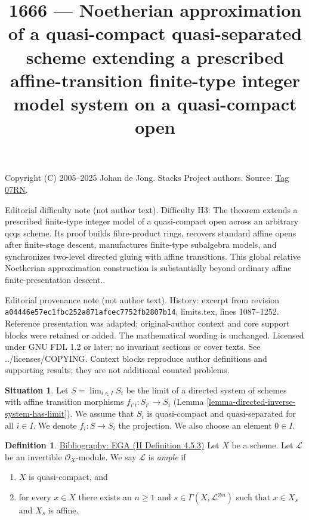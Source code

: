 \documentclass{amsart}
\newenvironment{reference}{\comment}{\endcomment}
\theoremstyle{plain}
\theoremstyle{definition}
\newtheorem{definition}[subsection]{Definition}
\newtheorem{situation}[subsection]{Situation}
\theoremstyle{remark}
\numberwithin{equation}{subsection}
\def\lim{\mathop{\mathrm{lim}}\nolimits}
\begin{document}
\title[Stacks Project, Tag 07RN]{1666 --- Noetherian approximation of a quasi-compact quasi-separated scheme extending a prescribed affine-transition finite-type integer model system on a quasi-compact open}
\maketitle
\noindent Copyright (C) 2005--2025 Johan de Jong. Stacks Project authors. Source: \href{https://stacks.math.columbia.edu/tag/07RN}{Tag 07RN}.

\noindent Editorial difficulty note (not author text). Difficulty H3: The theorem extends a prescribed finite-type integer model of a quasi-compact open across an arbitrary qcqs scheme. Its proof builds fibre-product rings, recovers standard affine opens after finite-stage descent, manufactures finite-type subalgebra models, and synchronizes two-level directed gluing with affine transitions. This global relative Noetherian approximation construction is substantially beyond ordinary affine finite-presentation descent..

\noindent Editorial provenance note (not author text). History: excerpt from revision \texttt{a0444\allowbreak 6e57e\allowbreak c1fbc\allowbreak 252a8\allowbreak 71afc\allowbreak ec775\allowbreak 2fb28\allowbreak 07b14}, limits.tex, lines 1087--1252. Reference presentation was adapted; original-author context and core support blocks were retained or added. The mathematical wording is unchanged. Licensed under GNU FDL 1.2 or later; no invariant sections or cover texts. See ../licenses/COPYING. Context blocks reproduce author definitions and supporting results; they are not additional counted problems.

\begin{situation}
\label{situation-descent}
Let $S = \lim_{i \in I} S_i$ be the limit of a directed system of schemes
with affine transition morphisms $f_{i'i} : S_{i'} \to S_i$
(Lemma \ref{lemma-directed-inverse-system-has-limit}).
We assume that $S_i$ is quasi-compact and quasi-separated for all $i \in I$.
We denote $f_i : S \to S_i$ the projection.
We also choose an element $0 \in I$.
\end{situation}

\begin{definition}
\label{properties-definition-ample}
\begin{reference}
\href{https://stacks.math.columbia.edu/bibliography}{Bibliography: EGA (II Definition 4.5.3)}
\end{reference}
Let $X$ be a scheme.
Let $\mathcal{L}$ be an invertible $\mathcal{O}_X$-module.
We say $\mathcal{L}$ is {\it ample} if
\begin{enumerate}
\item $X$ is quasi-compact, and
\item for every $x \in X$ there exists an $n \geq 1$
and $s \in \Gamma(X, \mathcal{L}^{\otimes n})$ such
that $x \in X_s$ and $X_s$ is affine.
\end{enumerate}
\end{definition}
\end{document}
